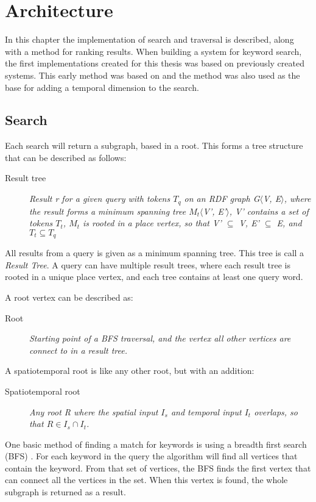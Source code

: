 \chapter{Architecture}
\label{cha:architecture}
In this chapter the implementation of search and traversal is described, along with a method for ranking results. When building a system for keyword search, the first implementations created for this thesis was based on previously created systems. This early method was based on \cite{Shi:2016:TRS:2882903.2882941} and the method was also used as the base for adding a temporal dimension to the search.

\section{Search}
Each search will return a subgraph, based in a root. This forms a tree structure that can be described as follows:
\begin{description}
    \item[Result tree] {\em Result r for a given query with tokens $T_q$ on an RDF graph G$\langle$V, E$\rangle$, where the result forms a minimum spanning tree $M_t\langle$V', E'$\rangle$, V' contains a set of tokens $T_t$, $M_t$ is rooted in a place vertex, so that V' $\subseteq$ V, E' $\subseteq$ E, and $T_t \subseteq T_q$}
\end{description}
All results from a query is given as a minimum spanning tree. This tree is call a {\em Result Tree}. A query can have multiple result trees, where each result tree is rooted in a unique place vertex, and each tree contains at least one query word.

A root vertex can be described as:
\begin{description}
    \item[Root] {\em Starting point of a BFS traversal, and the vertex all other vertices are connect to in a result tree.}
\end{description}

A spatiotemporal root is like any other root, but with an addition:
\begin{description}
    \item[Spatiotemporal root\label{rootST}] {\em Any root R where the spatial input $I_s$ and temporal input $I_t$ overlaps, so that $R \in I_s \cap I_t$.}
\end{description}

One basic method of finding a match for keywords is using a breadth first search (BFS) \cite{blinks, Shi:2016:TRS:2882903.2882941}. For each keyword in the query the algorithm will find all vertices that contain the keyword. From that set of vertices, the BFS finds the first vertex that can connect all the vertices in the set. When this vertex is found, the whole subgraph is returned as a result.

